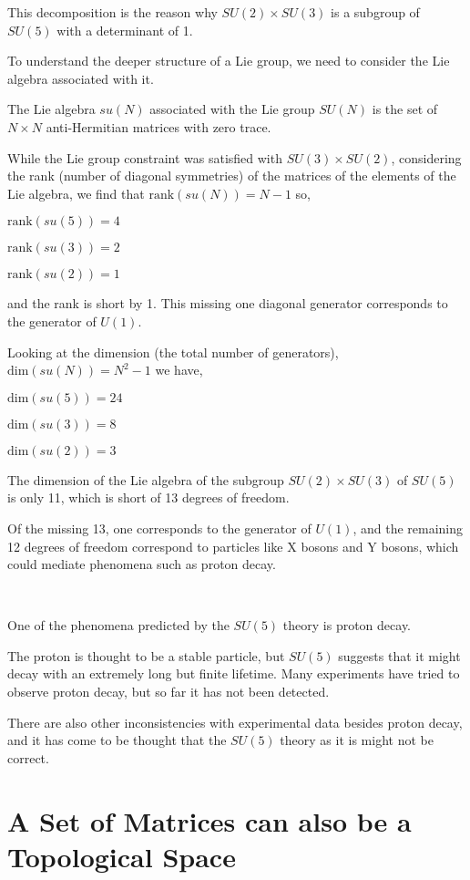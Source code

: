 \documentclass[uplatex,a4j,12pt,dvipdfmx]{jsarticle}
\begin{document}
This decomposition is the reason why $SU(2) \times SU(3)$ is a subgroup of $SU(5)$ with a determinant of 1.

To understand the deeper structure of a Lie group, we need to consider the Lie algebra associated with it.

The Lie algebra $su(N)$ associated with the Lie group $SU(N)$ is the set of $N \times N$ anti-Hermitian matrices with zero trace.

While the Lie group constraint was satisfied with $SU(3) \times SU(2)$,
considering the rank (number of diagonal symmetries) of the matrices of the elements of the Lie algebra, we find that
$\text{rank}(su(N))=N-1$
so,

$\text{rank}(su(5))=4$

$\text{rank}(su(3))=2$

$\text{rank}(su(2))=1$

and the rank is short by 1.
This missing one diagonal generator corresponds to the generator of $U(1)$.

Looking at the dimension (the total number of generators),
$\text{dim}(su(N))=N^{2} -1$
we have,

$\text{dim}(su(5))=24$

$\text{dim}(su(3))=8$

$\text{dim}(su(2))=3$

The dimension of the Lie algebra of the subgroup $SU(2) \times SU(3)$ of $SU(5)$ is only 11, which is short of 13 degrees of freedom.

Of the missing 13, one corresponds to the generator of $U(1)$, and the remaining 12 degrees of freedom correspond to particles like X bosons and Y bosons, which could mediate phenomena such as proton decay.

\ \ 

One of the phenomena predicted by the $SU(5)$ theory is proton decay.

The proton is thought to be a stable particle, but $SU(5)$ suggests that it might decay with an extremely long but finite lifetime.
Many experiments have tried to observe proton decay, but so far it has not been detected.

There are also other inconsistencies with experimental data besides proton decay, and it has come to be thought that the $SU(5)$ theory as it is might not be correct.

\section{A Set of Matrices can also be a Topological Space}
\end{document}

